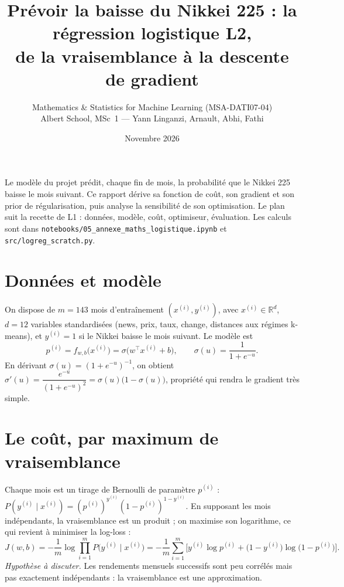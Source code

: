 \documentclass[11pt,a4paper]{article}
\title{\textbf{Prévoir la baisse du Nikkei 225 : la régression logistique L2,}\\[2pt]
\large de la vraisemblance à la descente de gradient}
\author{Mathematics \& Statistics for Machine Learning (MSA-DATI07-04)\\ Albert School, MSc~1 --- Yann Linganzi, Arnault, Abhi, Fathi}
\date{Novembre 2026}
\begin{document}
\maketitle

\noindent{}

\medskip


\noindent Le modèle du projet prédit, chaque fin de mois, la probabilité que le Nikkei 225 baisse le mois suivant. Ce
rapport dérive sa fonction de coût, son gradient et son prior de régularisation, puis analyse la sensibilité de son
optimisation. Le plan suit la recette de L1 : données, modèle, coût, optimiseur, évaluation. Les calculs sont dans
\texttt{notebooks/05\_annexe\_maths\_logistique.ipynb} et \texttt{src/logreg\_scratch.py}.

\section{Données et modèle}

On dispose de $m=143$ mois d'entraînement $(x^{(i)},y^{(i)})$, avec $x^{(i)}\in\mathbb R^{d}$, $d=12$ variables
standardisées (news, prix, taux, change, distances aux régimes k-means), et $y^{(i)}=1$ si le Nikkei baisse le mois
suivant. Le modèle est
\[
p^{(i)}=f_{w,b}\big(x^{(i)}\big)=\sigma\big(w^\top x^{(i)}+b\big),\qquad \sigma(u)=\frac{1}{1+e^{-u}} .
\]
En dérivant $\sigma(u)=(1+e^{-u})^{-1}$, on obtient
$\sigma'(u)=\dfrac{e^{-u}}{(1+e^{-u})^2}=\sigma(u)\big(1-\sigma(u)\big)$, propriété qui rendra le gradient très simple.

\section{Le coût, par maximum de vraisemblance}

Chaque mois est un tirage de Bernoulli de paramètre $p^{(i)}$ : $P(y^{(i)}\mid x^{(i)})=(p^{(i)})^{y^{(i)}}(1-p^{(i)})^{1-y^{(i)}}$.
En supposant les mois indépendants, la vraisemblance est un produit ; on maximise son logarithme, ce qui revient à
minimiser la log-loss :
\[
J(w,b)=-\frac1m\log\prod_{i=1}^{m}P\big(y^{(i)}\mid x^{(i)}\big)
=-\frac1m\sum_{i=1}^{m}\Big[y^{(i)}\log p^{(i)}+\big(1-y^{(i)}\big)\log\big(1-p^{(i)}\big)\Big].
\]
\emph{Hypothèse à discuter.} Les rendements mensuels successifs sont peu corrélés mais pas exactement indépendants :
la vraisemblance est une approximation.
\end{document}
